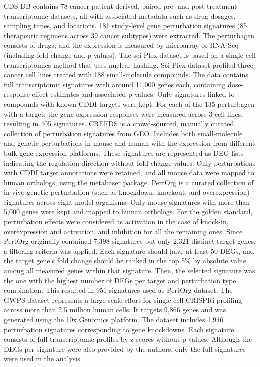 CDS-DB contains 78 cancer patient-derived, paired pre- and post-treatment transcriptomic datasets, all with associated metadata such as drug dosages, sampling times, and locations. 181 study-level gene perturbation signatures (85 therapeutic regimens across 39 cancer subtypes) were extracted. The perturbagen consists of drugs, and the expression is measured by microarray or RNA-Seq (including fold change and p-values). 
The sci-Plex dataset is based on a single-cell transcriptomics method that uses nuclear hashing. Sci-Plex dataset profiled three cancer cell lines treated with 188 small-molecule compounds. The data contains full transcriptomic signatures with around 11,000 genes each, containing dose-response effect estimates and associated p-values. Only signatures linked to compounds with known CDDI targets were kept. For each of the 135 perturbagen with a target, the gene expression responses were measured across 3 cell lines, resulting in 405 signatures. 
CREEDS is a crowd-sourced, manually curated collection of perturbation signatures from GEO. Includes both small-molecule and genetic perturbations in mouse and human with the expression from different bulk gene expression platforms. These signatures are represented as DEG lists indicating the regulation direction without fold change values. Only perturbations with CDDI target annotations were retained, and all mouse data were mapped to human orthologs, using the metabaser package.
PertOrg is a curated collection of in vivo genetic perturbation (such as knockdown, knockout, and overexpression) signatures across eight model organisms. Only mouse signatures with more than 5,000 genes were kept and mapped to human orthologs. For the golden standard, perturbation effects were considered as activation in the case  of knock-in, overexpression and activation, and inhibition for all the remaining ones. Since PertOrg originally contained 7,398 signatures but only 2,321 distinct target genes, a filtering criteria was applied. Each signature should have at least 50 DEGs, and the target gene's fold change should be ranked in the top 5\% by absolute value among all measured genes within that signature. Then, the selected signature was the one with the highest number of DEGs per target and perturbation type combination. This resulted in 951 signatures used as PertOrg dataset.
The GWPS dataset represents a large-scale effort for single-cell CRISPRi profiling across more than 2.5 million human cells. It targets 9,866 genes and was generated using the 10x Genomics platform. The dataset includes 1,946 perturbation signatures corresponding to gene knockdowns. Each signature consists of full transcriptomic profiles by z-scores without p-values. Although the DEGs per signature were also provided by the authors, only the full signatures were used in the analysis.


